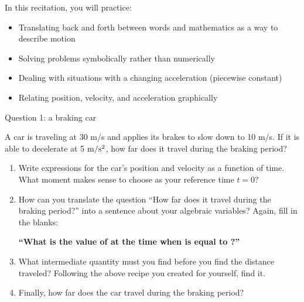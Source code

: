 \documentclass[12pt]{article}
\newcommand{\BI}{\begin{itemize}}
\newcommand{\EI}{\end{itemize}}
\begin{document}
\Large
\centerline{}
\normalsize
\centerline{}



\medskip

\rm In this recitation, you will practice:

\BI
\item Translating back and forth between words and mathematics as a way to describe motion
\item Solving problems symbolically rather than numerically
\item Dealing with situations with a changing acceleration (piecewise constant)
\item Relating position, velocity, and acceleration graphically
\EI
\newpage


\centerline{\Large Question 1: a braking car}


A car is traveling at 30 m/s and applies its brakes to slow down to 10 m/s. If it is able to decelerate at 5 $\rm m/\rm s^2$, how far does it travel during the braking period?

\begin{enumerate}
\item Write expressions for the car's position and velocity as a function of time. What moment makes sense to choose as your reference time $t=0$?

\vspace{1in}


\item How can you translate the question ``How far does it travel during the braking period?'' into a sentence about your algebraic variables? Again, fill in the blanks: 

\begin{center}
{\bf ``What is the value of \underline{\hspace{0.7in}} at the time when \underline{\hspace{0.7in}} is equal to \underline{\hspace{0.7in}}?''} 
\end{center}


\item What intermediate quantity must you find before you find the distance traveled? Following the above recipe you created for yourself, find it.




\vspace{2in}





\item Finally, how far does the car travel during the braking period?



\end{enumerate}
\end{document}
